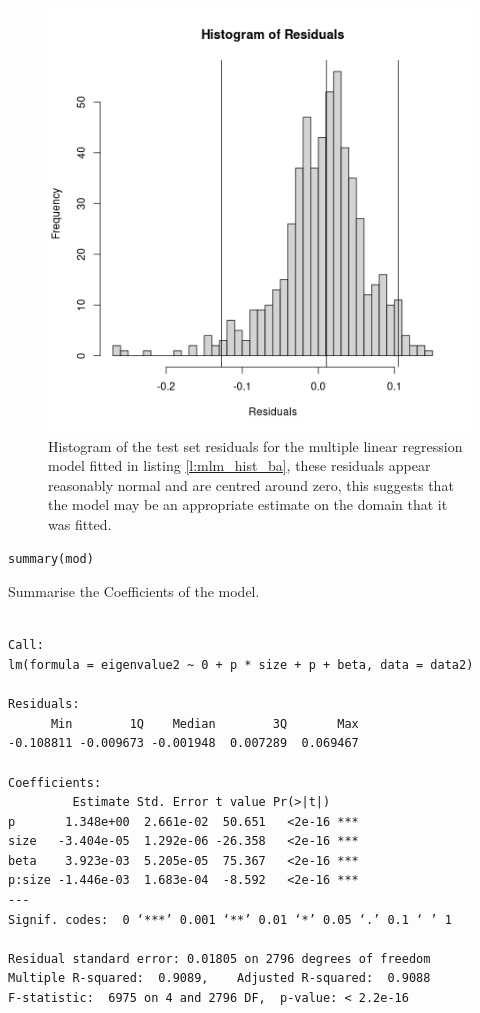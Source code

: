 \documentclass[11pt]{article}
\begin{document}
\begin{figure}[htbp]
\centering
\includegraphics[width=12cm]{media/ba_hist_mlm_mod.png}
\caption{\label{fig:mlm_hist_ba}Histogram of the test set residuals for the multiple linear regression model fitted in listing \ref{l:mlm_hist_ba}, these residuals appear reasonably normal and are centred around zero, this suggests that the model may be an appropriate estimate on the domain that it was fitted.}
\end{figure}


\begin{listing}[htbp]
\begin{verbatim}
summary(mod)
\end{verbatim}
\caption{\label{mod_summary}Summarise the Coefficients of the model.}
\end{listing}

\begin{verbatim}

Call:
lm(formula = eigenvalue2 ~ 0 + p * size + p + beta, data = data2)

Residuals:
      Min        1Q    Median        3Q       Max
-0.108811 -0.009673 -0.001948  0.007289  0.069467

Coefficients:
         Estimate Std. Error t value Pr(>|t|)
p       1.348e+00  2.661e-02  50.651   <2e-16 ***
size   -3.404e-05  1.292e-06 -26.358   <2e-16 ***
beta    3.923e-03  5.205e-05  75.367   <2e-16 ***
p:size -1.446e-03  1.683e-04  -8.592   <2e-16 ***
---
Signif. codes:  0 ‘***’ 0.001 ‘**’ 0.01 ‘*’ 0.05 ‘.’ 0.1 ‘ ’ 1

Residual standard error: 0.01805 on 2796 degrees of freedom
Multiple R-squared:  0.9089,	Adjusted R-squared:  0.9088
F-statistic:  6975 on 4 and 2796 DF,  p-value: < 2.2e-16
\end{verbatim}
\end{document}
